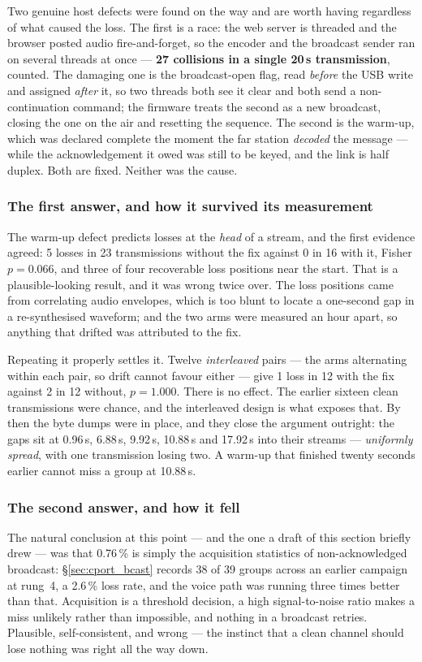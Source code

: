 Two genuine host defects were found on the way and are worth having
regardless of what caused the loss.  The first is a race: the web
server is threaded and the browser posted audio fire-and-forget, so the
encoder and the broadcast sender ran on several threads at once ---
\textbf{27 collisions in a single 20\,s transmission}, counted.  The
damaging one is the broadcast-open flag, read \emph{before} the USB
write and assigned \emph{after} it, so two threads both see it clear and
both send a non-continuation command; the firmware treats the second as
a new broadcast, closing the one on the air and resetting the sequence.
The second is the warm-up, which was declared complete the moment the
far station \emph{decoded} the message --- while the acknowledgement it
owed was still to be keyed, and the link is half duplex.  Both are
fixed.  Neither was the cause.

\subsubsection{The first answer, and how it survived its measurement}
The warm-up defect predicts losses at the \emph{head} of a stream, and
the first evidence agreed: 5 losses in 23 transmissions without the fix
against 0 in 16 with it, Fisher $p = 0.066$, and three of four
recoverable loss positions near the start.  That is a plausible-looking
result, and it was wrong twice over.  The loss positions came from
correlating audio envelopes, which is too blunt to locate a
one-second gap in a re-synthesised waveform; and the two arms were
measured an hour apart, so anything that drifted was attributed to the
fix.

Repeating it properly settles it.  Twelve \emph{interleaved} pairs ---
the arms alternating within each pair, so drift cannot favour either
--- give 1 loss in 12 with the fix against 2 in 12 without,
$p = 1.000$.  There is no effect.  The earlier sixteen clean
transmissions were chance, and the interleaved design is what exposes
that.  By then the byte dumps were in place, and they close the
argument outright: the gaps sit at 0.96\,s, 6.88\,s, 9.92\,s, 10.88\,s
and 17.92\,s into their streams --- \emph{uniformly spread}, with one
transmission losing two.  A warm-up that finished twenty seconds
earlier cannot miss a group at 10.88\,s.

\subsubsection{The second answer, and how it fell}
The natural conclusion at this point --- and the one a draft of this
section briefly drew --- was that 0.76\,\% is simply the acquisition
statistics of non-acknowledged broadcast: \S\ref{sec:cport_bcast}
records 38 of 39 groups across an earlier campaign at rung~4, a
2.6\,\% loss rate, and the voice path was running three times better
than that.  Acquisition is a threshold decision, a high
signal-to-noise ratio makes a miss unlikely rather than impossible,
and nothing in a broadcast retries.  Plausible, self-consistent, and
wrong --- the instinct that a clean channel should lose nothing was
right all the way down.

